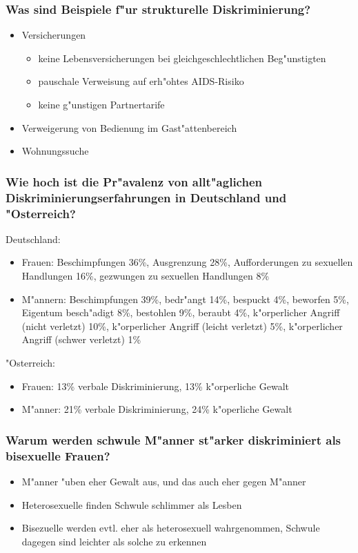 \subsubsection{Was sind Beispiele f"ur strukturelle Diskriminierung?}
\begin{itemize}
        \item Versicherungen
                \begin{itemize}
                        \item keine Lebensversicherungen bei gleichgeschlechtlichen Beg"unstigten
                        \item pauschale Verweisung auf erh"ohtes AIDS-Risiko
                        \item keine g"unstigen Partnertarife
                \end{itemize}
        \item Verweigerung von Bedienung im Gast"attenbereich
        \item Wohnungssuche
\end{itemize}

\subsubsection{Wie hoch ist die Pr"avalenz von allt"aglichen Diskriminierungserfahrungen in Deutschland und "Osterreich?}
Deutschland:
\begin{itemize}
        \item Frauen: Beschimpfungen 36\%, Ausgrenzung 28\%, Aufforderungen zu sexuellen Handlungen 16\%, gezwungen zu sexuellen Handlungen 8\%
        \item M"annern: Beschimpfungen 39\%, bedr"angt 14\%, bespuckt 4\%, beworfen 5\%, Eigentum besch"adigt 8\%, bestohlen 9\%, beraubt 4\%, k"orperlicher Angriff (nicht verletzt) 10\%, k"orperlicher Angriff (leicht verletzt) 5\%, k"orperlicher Angriff (schwer verletzt) 1\%
\end{itemize}

\noindent "Osterreich:
\begin{itemize}
        \item Frauen: 13\% verbale Diskriminierung, 13\% k"orperliche Gewalt
        \item M"anner: 21\% verbale Diskriminierung, 24\% k"operliche Gewalt
\end{itemize}

\subsubsection{Warum werden schwule M"anner st"arker diskriminiert als bisexuelle Frauen?}
\begin{itemize}
        \item M"anner "uben eher Gewalt aus, und das auch eher gegen M"anner
        \item Heterosexuelle finden Schwule schlimmer als Lesben
        \item Bisezuelle werden evtl. eher als heterosexuell wahrgenommen, Schwule dagegen sind leichter als solche zu erkennen
\end{itemize}

